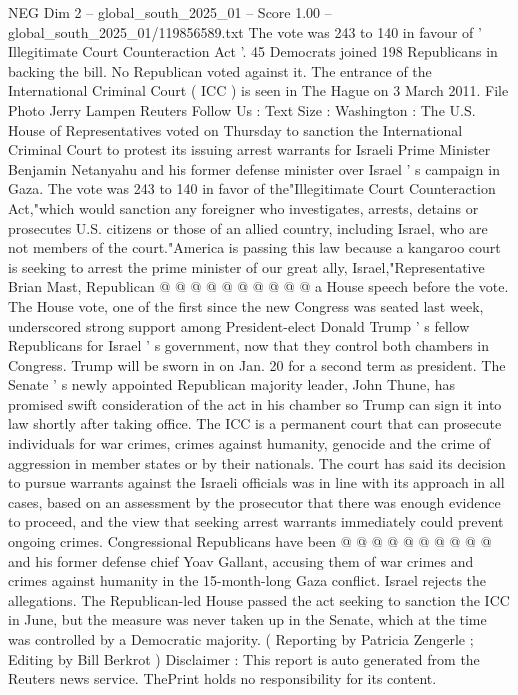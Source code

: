 \begin{textsample}{NEG Dim 2 – global\_south\_2025\_01 – Score 1.00 – global\_south\_2025\_01/119856589.txt}  \label{ex:f2_neg_132}
The vote was 243 to 140 in favour of ' Illegitimate Court Counteraction Act '. 45 Democrats joined 198 Republicans in backing the bill.
No Republican voted against it.
The entrance of the International Criminal Court ( ICC ) is seen in The Hague on 3 March 2011.
File Photo Jerry Lampen Reuters Follow Us : Text Size : Washington : The U.S.
House of Representatives voted on Thursday to sanction the International Criminal Court to protest its issuing arrest warrants for Israeli Prime Minister Benjamin Netanyahu and his former defense minister over Israel ' s campaign in Gaza.
The vote was 243 to 140 in favor of the"Illegitimate Court Counteraction Act,"which would sanction any foreigner who investigates, arrests, detains or prosecutes U.S. citizens or those of an allied country, including Israel, who are not members of the court."America is passing this law because a kangaroo court is seeking to arrest the prime minister of our great ally, Israel,"Representative Brian Mast, Republican @ @ @ @ @ @ @ @ @ @ a House speech before the vote.
The House vote, one of the first since the new Congress was seated last week, underscored strong support among President-elect Donald Trump ' s fellow Republicans for Israel ' s government, now that they control both chambers in Congress.
Trump will be sworn in on Jan. 20 for a second term as president.
The Senate ' s newly appointed Republican majority leader, John Thune, has promised swift consideration of the act in his chamber so Trump can sign it into law shortly after taking office.
The ICC is a permanent court that can prosecute individuals for war crimes, crimes against humanity, genocide and the crime of aggression in member states or by their nationals.
The court has said its decision to pursue warrants against the Israeli officials was in line with its approach in all cases, based on an assessment by the prosecutor that there was enough evidence to proceed, and the view that seeking arrest warrants immediately could prevent ongoing crimes.
Congressional Republicans have been @ @ @ @ @ @ @ @ @ @ and his former defense chief Yoav Gallant, accusing them of war crimes and crimes against humanity in the 15-month-long Gaza conflict.
Israel rejects the allegations.
The Republican-led House passed the act seeking to sanction the ICC in June, but the measure was never taken up in the Senate, which at the time was controlled by a Democratic majority. ( Reporting by Patricia Zengerle ; Editing by Bill Berkrot ) Disclaimer : This report is auto generated from the Reuters news service.
ThePrint holds no responsibility for its content.

\end{textsample}

